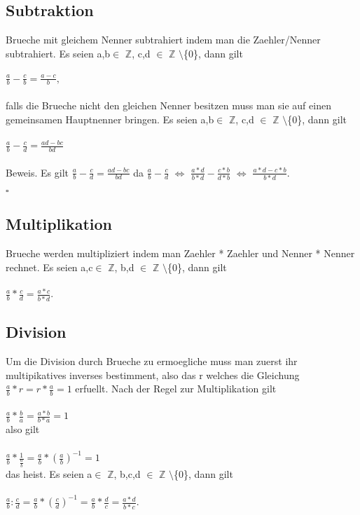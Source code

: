 \documentclass[../AbiMappe_Mathe.tex]{subfiles}
\begin{document}
\subsection{Subtraktion}
Brueche mit gleichem Nenner subtrahiert indem man die Zaehler/Nenner subtrahiert.
Es seien a,b$\in$ $\mathds{Z}$, c,d $\in$  $\mathds{Z}$ $\setminus$\{0\}, dann gilt\\\\\noindent\hspace*{10mm}%
$
	\frac{a}{b}-\frac{c}{b}=\frac{a-c}{b},
$\\\\
falls die Brueche nicht den gleichen Nenner besitzen muss man sie auf einen gemeinsamen Hauptnenner bringen.
Es seien a,b$\in$ $\mathds{Z}$, c,d $\in$  $\mathds{Z}$ $\setminus$\{0\}, dann gilt\\\\\noindent\hspace*{10mm}%
$
	\frac{a}{b}-\frac{c}{d}=\frac{ad-bc}{bd}
$\\\\
Beweis. Es gilt $\frac{a}{b}-\frac{c}{d}=\frac{ad-bc}{bd}$ da $\frac{a}{b}-\frac{c}{d}$
$\Leftrightarrow$ $\frac{a*d}{b*d}-\frac{c*b}{d*b}$
$\Leftrightarrow$ $\frac{a*d-c*b}{b*d}$.
\begin{flushright}$\square$\end{flushright}




\subsection{Multiplikation}
Brueche werden multipliziert indem man Zaehler * Zaehler und Nenner * Nenner rechnet.
Es seien a,c$\in$ $\mathds{Z}$, b,d $\in$ $\mathds{Z}$ $\setminus$\{0\}, dann gilt\\\\\noindent\hspace*{10mm}%
$
	\frac{a}{b}*\frac{c}{d}=\frac{a*c}{b*d}.
$
\subsection{Division}
Um die Division durch Brueche zu ermoegliche muss man zuerst ihr multipikatives inverses bestimment, also das r
welches die Gleichung $\frac{a}{b}*r = r*\frac{a}{b}=1$ erfuellt. Nach der Regel zur Multiplikation gilt\\\\\noindent\hspace*{10mm}%
$
	\frac{a}{b} * \frac{b}{a} = \frac{a*b}{b*a} = 1
$
\\also gilt \\\\\noindent\hspace*{10mm}%
$\frac{a}{b} * \frac{1}{\frac{a}{b}}= \frac{a}{b} * (\frac{a}{b})^{-1}=1$\\
das heist. Es seien a$\in$ $\mathds{Z}$, b,c,d $\in$ $\mathds{Z}$ $\setminus$\{0\}, dann gilt\\\\\noindent\hspace*{10mm}%
$
	\frac{a}{b} : \frac{c}{d} = \frac{a}{b} * (\frac{c}{d})^{-1} = \frac{a}{b} * \frac{d}{c} = \frac{a*d}{b*c}.
$
\end{document}
